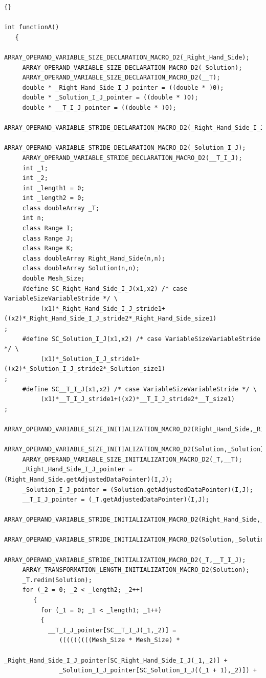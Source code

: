 \documentclass[10pt]{article}
\begin{document}
\begin{lstlisting}{}

int functionA()
   { 
     ARRAY_OPERAND_VARIABLE_SIZE_DECLARATION_MACRO_D2(_Right_Hand_Side); 
     ARRAY_OPERAND_VARIABLE_SIZE_DECLARATION_MACRO_D2(_Solution); 
     ARRAY_OPERAND_VARIABLE_SIZE_DECLARATION_MACRO_D2(__T); 
     double * _Right_Hand_Side_I_J_pointer = ((double * )0); 
     double * _Solution_I_J_pointer = ((double * )0); 
     double * __T_I_J_pointer = ((double * )0); 
     ARRAY_OPERAND_VARIABLE_STRIDE_DECLARATION_MACRO_D2(_Right_Hand_Side_I_J); 
     ARRAY_OPERAND_VARIABLE_STRIDE_DECLARATION_MACRO_D2(_Solution_I_J); 
     ARRAY_OPERAND_VARIABLE_STRIDE_DECLARATION_MACRO_D2(__T_I_J); 
     int _1; 
     int _2; 
     int _length1 = 0; 
     int _length2 = 0; 
     class doubleArray _T;
     int n;
     class Range I;
     class Range J;
     class Range K;
     class doubleArray Right_Hand_Side(n,n);
     class doubleArray Solution(n,n);
     double Mesh_Size; 
     #define SC_Right_Hand_Side_I_J(x1,x2) /* case VariableSizeVariableStride */ \
          (x1)*_Right_Hand_Side_I_J_stride1+((x2)*_Right_Hand_Side_I_J_stride2*_Right_Hand_Side_size1)
;
     #define SC_Solution_I_J(x1,x2) /* case VariableSizeVariableStride */ \
          (x1)*_Solution_I_J_stride1+((x2)*_Solution_I_J_stride2*_Solution_size1)
;
     #define SC__T_I_J(x1,x2) /* case VariableSizeVariableStride */ \
          (x1)*__T_I_J_stride1+((x2)*__T_I_J_stride2*__T_size1)
; 
     ARRAY_OPERAND_VARIABLE_SIZE_INITIALIZATION_MACRO_D2(Right_Hand_Side,_Right_Hand_Side); 
     ARRAY_OPERAND_VARIABLE_SIZE_INITIALIZATION_MACRO_D2(Solution,_Solution); 
     ARRAY_OPERAND_VARIABLE_SIZE_INITIALIZATION_MACRO_D2(_T,__T); 
     _Right_Hand_Side_I_J_pointer = (Right_Hand_Side.getAdjustedDataPointer)(I,J); 
     _Solution_I_J_pointer = (Solution.getAdjustedDataPointer)(I,J); 
     __T_I_J_pointer = (_T.getAdjustedDataPointer)(I,J); 
     ARRAY_OPERAND_VARIABLE_STRIDE_INITIALIZATION_MACRO_D2(Right_Hand_Side,_Right_Hand_Side_I_J); 
     ARRAY_OPERAND_VARIABLE_STRIDE_INITIALIZATION_MACRO_D2(Solution,_Solution_I_J); 
     ARRAY_OPERAND_VARIABLE_STRIDE_INITIALIZATION_MACRO_D2(_T,__T_I_J); 
     ARRAY_TRANSFORMATION_LENGTH_INITIALIZATION_MACRO_D2(Solution); 
     _T.redim(Solution); 
     for (_2 = 0; _2 < _length2; _2++)
        { 
          for (_1 = 0; _1 < _length1; _1++)
          { 
            __T_I_J_pointer[SC__T_I_J(_1,_2)] = 
               (((((((((Mesh_Size * Mesh_Size) *
               _Right_Hand_Side_I_J_pointer[SC_Right_Hand_Side_I_J(_1,_2)] +
               _Solution_I_J_pointer[SC_Solution_I_J((_1 + 1),_2)]) +

\end{lstlisting}
\end{document}
